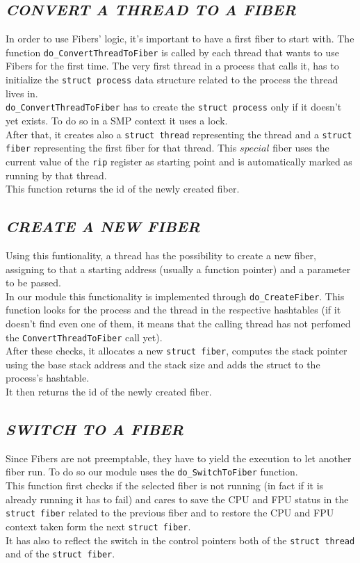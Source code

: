 \documentclass[a4paper]{article}
\begin{document}
\subsection*{\textit{CONVERT A THREAD TO A FIBER}}
In order to use Fibers' logic, it's important to have a first fiber to start with. The function \texttt{do\_ConvertThreadToFiber} is called by each thread that wants to use Fibers for the first time. The very first thread in a process that calls it, has to initialize the \texttt{struct process} data structure related to the process the thread lives in.\bigskip\\
\texttt{do\_ConvertThreadToFiber} has to create the \texttt{struct process} only if it doesn't yet exists. To do so in a SMP context it uses a lock.\bigskip\\
After that, it creates also a \texttt{struct thread} representing the thread and a \texttt{struct fiber} representing the first fiber for that thread.
This $special$ fiber uses the current value of the \texttt{rip} register as starting point and is automatically marked as running by that thread.\bigskip\\
This function returns the id of the newly created fiber.

\subsection*{\textit{CREATE A NEW FIBER}}
Using this funtionality, a thread has the possibility to create a new fiber, assigning to that a starting address (usually a function pointer) and a parameter to be passed.\bigskip\\
In our module this functionality is implemented through \texttt{do\_CreateFiber}. This function looks for the process and the thread in the respective hashtables (if it doesn't find even one of them, it means that the calling thread has not perfomed the \texttt{ConvertThreadToFiber} call yet).\bigskip\\
After these checks, it allocates a new \texttt{struct fiber}, computes the stack pointer using the base stack address and the stack size and adds the struct to the process's hashtable.\bigskip\\
It then returns the id of the newly created fiber.

\subsection*{\textit{SWITCH TO A FIBER}}
Since Fibers are not preemptable, they have to yield the execution to let another fiber run. To do so our module uses the \texttt{do\_SwitchToFiber} function.\bigskip\\
This function first checks if the selected fiber is not running (in fact if it is already running it has to fail) and cares to save the CPU and FPU status in the \texttt{struct fiber} related to the previous fiber and to restore the CPU and FPU context taken form the next \texttt{struct fiber}.\bigskip\\
It has also to reflect the switch in the control pointers both of the \texttt{struct thread} and of the \texttt{struct fiber}.
\end{document}
